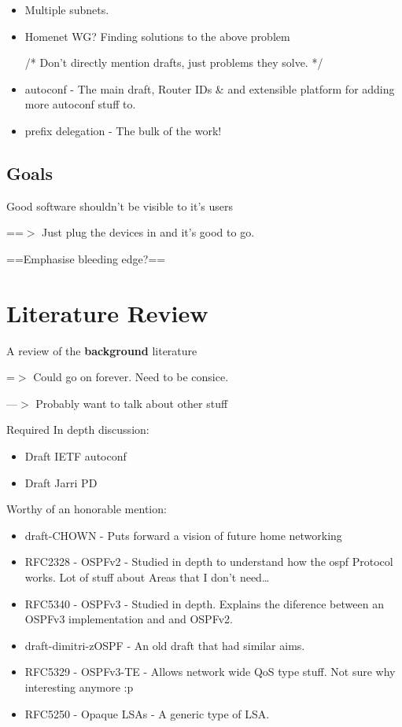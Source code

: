 \documentclass[12pt]{report}
\begin{document}
\begin{itemize}
\item Multiple subnets. 
\item Homenet WG? Finding solutions to the above problem

/* Don't directly mention drafts, just problems they solve. */

\item autoconf - The main draft, Router IDs \& and extensible platform for adding more autoconf stuff to.
\item prefix delegation - The bulk of the work!
\end{itemize}

\section{Goals}
Good software shouldn't be visible to it's users

==$>$ Just plug the devices in and it's good to go. 

==Emphasise bleeding edge?==

\chapter{Literature Review} 
A review of the \textbf{background} literature

=$>$ Could go on forever. Need to be consice. 

---$>$ Probably want to talk about other stuff

Required In depth discussion:
\begin{itemize}
\item Draft IETF autoconf 
\item Draft Jarri PD
\end{itemize}

Worthy of an honorable mention:

\begin{itemize}
\item draft-CHOWN - Puts forward a vision of future home networking
\item RFC2328 - OSPFv2 - Studied in depth to understand how the ospf Protocol works. Lot of stuff about Areas that I don't need\ldots
\item RFC5340 - OSPFv3 - Studied in depth. Explains the diference between an OSPFv3 implementation and and OSPFv2.
\item draft-dimitri-zOSPF - An old draft that had similar aims.
\item RFC5329 - OSPFv3-TE - Allows network wide QoS type stuff. Not sure why interesting anymore :p
\item RFC5250 - Opaque LSAs - A generic type of LSA. 
\end{itemize}
\end{document}

